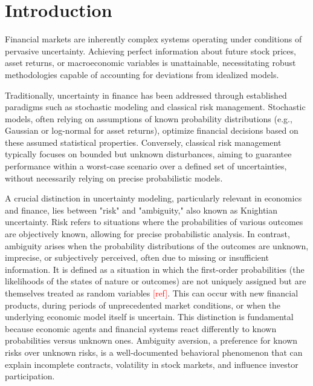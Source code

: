 \documentclass[preprint,12pt,authoryear]{elsarticle}
\begin{document}


\section{Introduction}

Financial markets are inherently complex systems operating under conditions of pervasive uncertainty. Achieving perfect information about future stock prices, asset returns, or macroeconomic variables is unattainable, necessitating robust methodologies capable of accounting for deviations from idealized models.

Traditionally, uncertainty in finance has been addressed through established paradigms such as stochastic modeling and classical risk management. Stochastic models, often relying on assumptions of known probability distributions (e.g., Gaussian or log-normal for asset returns), optimize financial decisions based on these assumed statistical properties. Conversely, classical risk management typically focuses on bounded but unknown disturbances, aiming to guarantee performance within a worst-case scenario over a defined set of uncertainties, without necessarily relying on precise probabilistic models.

A crucial distinction in uncertainty modeling, particularly relevant in economics and finance, lies between "risk" and "ambiguity," also known as Knightian uncertainty. Risk refers to situations where the probabilities of various outcomes are objectively known, allowing for precise probabilistic analysis. In contrast, ambiguity arises when the probability distributions of the outcomes are unknown, imprecise, or subjectively perceived, often due to missing or insufficient information. It is defined as a situation in which the first-order probabilities (the likelihoods of the states of nature or outcomes) are not uniquely assigned but are themselves treated as random variables \textcolor{red}{[ref]}. This can occur with new financial products, during periods of unprecedented market conditions, or when the underlying economic model itself is uncertain. This distinction is fundamental because economic agents and financial systems react differently to known probabilities versus unknown ones. Ambiguity aversion, a preference for known risks over unknown risks, is a well-documented behavioral phenomenon that can explain incomplete contracts, volatility in stock markets, and influence investor participation.
\end{document}
